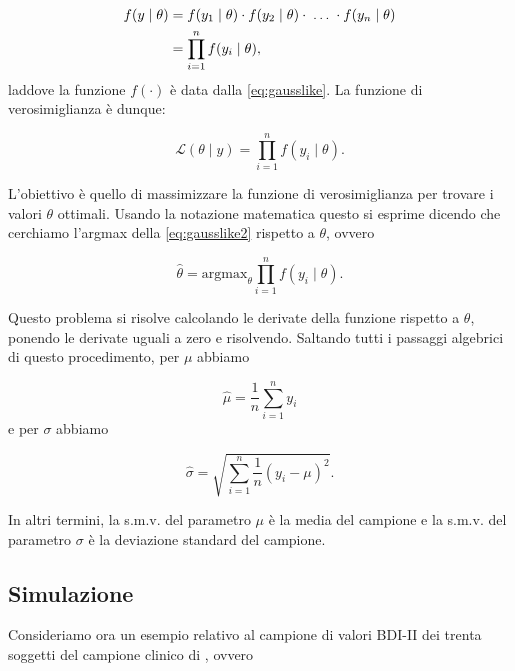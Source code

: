 \documentclass[
]{memoir}
\theoremstyle{definition}
\theoremstyle{definition}
\theoremstyle{definition}
\theoremstyle{definition}
\theoremstyle{remark}
\begin{document}
\[
\begin{aligned}
f(y \mid \theta) &= f(y_1 \mid \theta) \cdot f(y_2 \mid \theta) \cdot \; \dots \; \cdot f(y_n \mid \theta)\notag\\
&= \prod_{i=1}^n f(y_i \mid \theta),
\end{aligned}
\]
laddove la funzione \(f(\cdot)\) è data dalla \eqref{eq:gausslike}. La funzione di verosimiglianza è dunque:

\begin{equation}
\mathcal{L}(\theta \mid y) = \prod_{i=1}^n f(y_i \mid \theta).
\label{eq:gausslike2}
\end{equation}

L'obiettivo è quello di massimizzare la funzione di verosimiglianza per trovare i valori \(\theta\) ottimali. Usando la notazione matematica questo si esprime dicendo che cerchiamo l'argmax della \eqref{eq:gausslike2} rispetto a \(\theta\), ovvero

\[
\hat{\theta} = \text{argmax}_{\theta} \prod_{i=1}^n f(y_i \mid \theta).
\]

Questo problema si risolve calcolando le derivate della funzione rispetto a \(\theta\), ponendo le derivate uguali a zero e risolvendo. Saltando tutti i passaggi algebrici di questo procedimento, per \(\mu\) abbiamo

\begin{equation}
\hat{\mu} = \frac{1}{n} \sum_{i=1}^n y_i
\label{eq:maxlikemu}
\end{equation}
e per \(\sigma\) abbiamo

\begin{equation}
\hat{\sigma} = \sqrt{\sum_{i=1}^n\frac{1}{n}(y_i- \mu)^2}.
\label{eq:maxlikesigma}
\end{equation}

In altri termini, la s.m.v. del parametro \(\mu\) è la media del campione e la s.m.v. del parametro \(\sigma\) è la deviazione standard del campione.

\hypertarget{simulazione}{%
\subsection{Simulazione}\label{simulazione}}

Consideriamo ora un esempio relativo al campione di valori BDI-II dei trenta soggetti del campione clinico di \citet{zetschefuture2019}, ovvero
\end{document}

